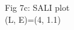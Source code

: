 \documentclass[preview]{standalone}
\begin{document}
\begin{center}
Fig 7c: SALI plot\\ (L, E)=(4, 1.1)
\end{center}
\end{document}
